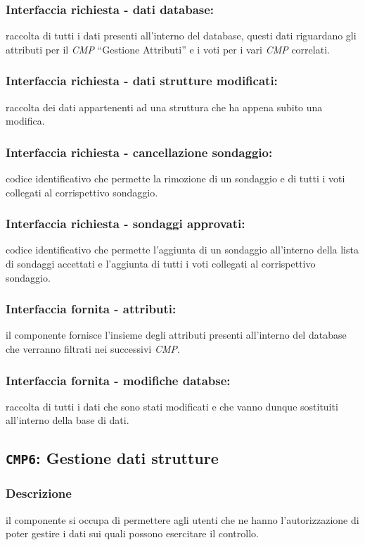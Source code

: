         \subsubsection{Interfaccia richiesta - dati database:}
            raccolta di tutti i dati presenti all'interno del database, questi dati riguardano gli attributi per il \textit{CMP} ``Gestione Attributi'' e i voti per i vari \textit{CMP} correlati.
        \subsubsection{Interfaccia richiesta - dati strutture modificati:}
            raccolta dei dati appartenenti ad una struttura che ha appena subito una modifica.
        \subsubsection{Interfaccia richiesta - cancellazione sondaggio:}
            codice identificativo che permette la rimozione di un sondaggio e di tutti i voti collegati al corrispettivo sondaggio.
        \subsubsection{Interfaccia richiesta - sondaggi approvati:}
            codice identificativo che permette l'aggiunta di un sondaggio all'interno della lista di sondaggi accettati e l'aggiunta di tutti i voti collegati al corrispettivo sondaggio.
        \subsubsection{Interfaccia fornita - attributi:}
            il componente fornisce l'insieme degli attributi presenti all'interno del database che verranno filtrati nei successivi \textit{CMP}.
        \subsubsection{Interfaccia fornita - modifiche databse:}
            raccolta di tutti i dati che sono stati modificati e che vanno dunque sostituiti all'interno della base di dati.
    
    \subsection{\texttt{CMP6}: Gestione dati strutture}
        \subsubsection{Descrizione}
            il componente si occupa di permettere agli utenti che ne hanno l'autorizzazione di poter gestire i dati sui quali possono esercitare il controllo.
